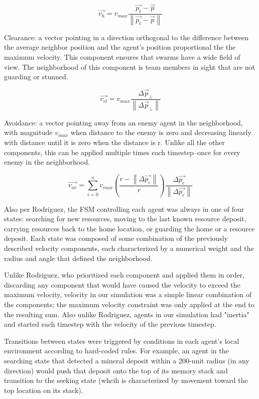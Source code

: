 \documentclass[12pt,journal,compsoc]{IEEEtran}
\begin{document}
\[ \vec{v_h} = v_{max} \frac {\vec{p_t} - \vec p} { \left\| \vec{p_t} - \vec p \right\| } \]

Clearance: a vector pointing in a direction orthogonal to the difference between the average neighbor position and the agent's position proportional the the maximum velocity. This component ensures that swarms have a wide field of view. The neighborhood of this component is team members in sight that are not guarding or stunned.

\[ \vec{v_{cl}} = v_{max} \frac {\Delta \vec p_\perp } { \left\| \Delta \vec p_\perp  \right\| }  \]

Avoidance: a vector pointing away from an enemy agent in the neighborhood, with magnitude $v_{max}$ when distance to the enemy is zero and decreasing linearly with distance until it is zero when the distance is r. Unlike all the other components, this can be applied multiple times each timestep--once for every enemy in the neighborhood.

\[ \vec { v_{ av } } =\sum _{i=0}^{n} {v_{ max } \left( \frac{r - \left\| \Delta \vec{p_e} \right\|} {r} \right) \frac { \Delta \vec { p_e }  }{ \left\| \Delta \vec { p_e }  \right\|  }}  \]

Also per Rodriguez, the FSM controlling each agent was always in one of four states: searching for new resources, moving to the last known resource deposit, carrying resources back to the home location, or guarding the home or a resource deposit. Each state was composed of some combination of the previously described velocity components, each characterized by a numerical weight and the radius and angle that defined the neighborhood.

Unlike Rodriguez, who prioritized each component and applied them in order, discarding any component that would have caused the velocity to exceed the maximum velocity, velocity in our simulation was a simple linear combination of the components; the maximum velocity constraint was only applied at the end to the resulting sum. Also unlike Rodriguez, agents in our simulation had "inertia" and started each timestep with the velocity of the previous timestep.

Transitions between states were triggered by conditions in each agent's local environment according to hard-coded rules. For example, an agent in the searching state that detected a mineral deposit within a 200-unit radius (in any direction) would push that deposit onto the top of its memory stack and transition to the seeking state (whcih is characterized by movement toward the top location on its stack).
\end{document}
